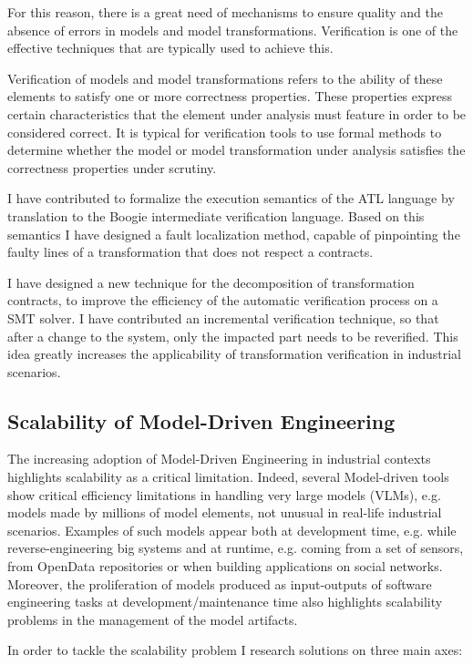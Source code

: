 For this reason, there is a great need of mechanisms to ensure quality and the absence of errors in models and model transformations. Verification is one of the effective techniques that are typically used to achieve this.

Verification of models and model transformations refers to the ability of these elements to satisfy one or more correctness properties. These properties express certain characteristics that the element under analysis must feature in order to be considered correct. It is typical for verification tools to use formal methods to determine whether the model or model transformation under analysis satisfies the correctness properties under scrutiny.

I have contributed to formalize the execution semantics of the ATL language by translation to the Boogie intermediate verification language. Based on this semantics I have designed a fault localization method, capable of pinpointing the faulty lines of a transformation that does not respect a contracts.

I have designed a new technique for the decomposition of transformation contracts, to improve the efficiency of the automatic verification process on a SMT solver. I have contributed an incremental verification technique, so that after a change to the system, only the impacted part needs to be reverified. This idea greatly increases the applicability of transformation verification in industrial scenarios. 

\subsection*{Scalability of Model-Driven Engineering}
The increasing adoption of Model-Driven Engineering in industrial contexts highlights scalability as a critical limitation. Indeed, several Model-driven tools show critical efficiency limitations in handling very large models (VLMs), e.g. models made by millions of model elements, not unusual in real-life industrial scenarios. Examples of such models appear both at development time, e.g. while reverse-engineering big systems and at runtime, e.g. coming from a set of sensors, from OpenData repositories or when building applications on social networks. Moreover, the proliferation of models produced as input-outputs of software engineering tasks at development/maintenance time also highlights scalability problems in the management of the model artifacts.

In order to tackle the scalability problem I research solutions on three main axes:

